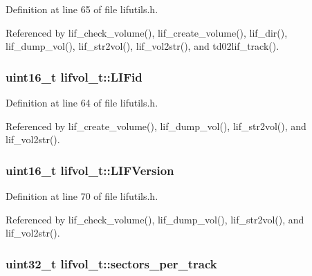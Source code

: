 Definition at line 65 of file lifutils.\+h.



Referenced by lif\+\_\+check\+\_\+volume(), lif\+\_\+create\+\_\+volume(), lif\+\_\+dir(), lif\+\_\+dump\+\_\+vol(), lif\+\_\+str2vol(), lif\+\_\+vol2str(), and td02lif\+\_\+track().

\subsubsection[{\texorpdfstring{L\+I\+Fid}{LIFid}}]{\setlength{\rightskip}{0pt plus 5cm}uint16\+\_\+t lifvol\+\_\+t\+::\+L\+I\+Fid}\hypertarget{structlifvol__t_adb6a0c2fff5b765eb12c3eb5db6d5bad}{}\label{structlifvol__t_adb6a0c2fff5b765eb12c3eb5db6d5bad}


Definition at line 64 of file lifutils.\+h.



Referenced by lif\+\_\+create\+\_\+volume(), lif\+\_\+dump\+\_\+vol(), lif\+\_\+str2vol(), and lif\+\_\+vol2str().

\subsubsection[{\texorpdfstring{L\+I\+F\+Version}{LIFVersion}}]{\setlength{\rightskip}{0pt plus 5cm}uint16\+\_\+t lifvol\+\_\+t\+::\+L\+I\+F\+Version}\hypertarget{structlifvol__t_afffd824a7b0ce6aa8410fa243733475f}{}\label{structlifvol__t_afffd824a7b0ce6aa8410fa243733475f}


Definition at line 70 of file lifutils.\+h.



Referenced by lif\+\_\+check\+\_\+volume(), lif\+\_\+dump\+\_\+vol(), lif\+\_\+str2vol(), and lif\+\_\+vol2str().

\subsubsection[{\texorpdfstring{sectors\+\_\+per\+\_\+track}{sectors_per_track}}]{\setlength{\rightskip}{0pt plus 5cm}uint32\+\_\+t lifvol\+\_\+t\+::sectors\+\_\+per\+\_\+track}\hypertarget{structlifvol__t_ad245f7419e180934262f53acd9b4349c}{}\label{structlifvol__t_ad245f7419e180934262f53acd9b4349c}


